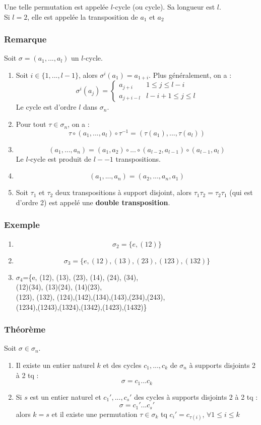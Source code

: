 \documentclass[a4paper, oneside]{report}
\newcommand{\remar}{\subsubsection{Remarque}}
\newcommand{\exem}{\subsubsection{Exemple}}
\newcommand{\theo}{\subsubsection{Théorème}}
\begin{document}
Une telle permutation est appelée $l$-cycle (ou cycle). Sa longueur est $l$.\\
Si $l=2$, elle est appelée la transposition de $a_1$ et $a_2$

\remar
Soit $\sigma=(a_1,...,a_l)$ un $l$-cycle.
\begin{enumerate}
\item Soit $i\in \{1,...,l-1\}$, alors $\sigma^i(a_1)=a_{1+i}$. Plus généralement, on a :
$$\sigma^i(a_j)= \left\{\begin{array}{ll}
a_{j+i}& 1\leq j \leq l-i\\
a_{j+i-l}& l-i+1\leq j \leq l
\end{array}\right.$$
Le cycle est d'ordre $l$ dans $\sigma_n$.

\item Pour tout $\tau \in \sigma_n$, on a :
$$\tau \circ (a_1,...,a_l) \circ \tau^{-1}=(\tau(a_1),...,\tau(a_l))$$

\item 
$$ (a_1,...,a_n)=(a_1,a_2)\circ...\circ (a_{l-2}, a_{l-1}) \circ (a_{l-1}, a_l)$$
Le $l$-cycle est produit de $l--1$ transpositions.

\item 
$$(a_1,...,a_n)=(a_2,...,a_n,a_1)$$

\item Soit $\tau_1$ et $\tau_2$ deux transpositions à support disjoint, alors $\tau_1\tau_2 = \tau_2\tau_1$ (qui est d'ordre 2) est appelé une \textbf{double transposition}.
 
\end{enumerate}

\exem
\begin{enumerate}
\item $$\sigma_2=\{e, (12)\}$$
\item $$\sigma_3=\{e, (12), (13), (23), (123), (132)\}$$
\item
\begin{center}
$\sigma_4$=\{e, (12), (13), (23), (14), (24), (34),\\
(12)(34), (13)(24), (14)(23),\\
(123), (132), (124),(142),(134),(143),(234),(243),\\
(1234),(1243),(1324),(1342),(1423),(1432)\}
\end{center} 
\end{enumerate}

\theo
Soit $\sigma\in \sigma_n$.
\begin{enumerate}
\item Il existe un entier naturel $k$ et des cycles $c_1,...,c_k$ de $\sigma_n$ à supports disjoints 2 à 2 tq :
$$\sigma = c_1...c_k$$

\item Si $s$ est un entier naturel et $c_1',...,c_s'$ des cycles à supports disjoints 2 à 2 tq :
$$\sigma = c_1'...c_s'$$
alors $k=s$ et il existe une permutation $\tau \in \sigma_k$ tq $c_i'=c_{\tau(i)}$, $\forall 1\leq i \leq k$
\end{enumerate}
\end{document}
